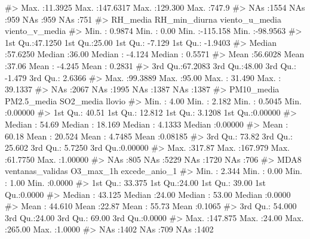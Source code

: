 \documentclass[
  spanish,
  letterpaper,
  DIV=11,
  numbers=noendperiod]{scrartcl}
\newenvironment{Shaded}{\begin{snugshade}}{\end{snugshade}}
\newcommand{\CommentTok}[1]{\textcolor[rgb]{0.37,0.37,0.37}{#1}}
\begin{document}
\begin{Shaded}
\begin{Highlighting}[]
\CommentTok{\#\textgreater{}  Max.   :11.3925   Max.   :147.6317   Max.   :129.300   Max.   :747.9  }
\CommentTok{\#\textgreater{}  NAs    :1554      NAs    :959        NAs    :959       NAs    :751    }
\CommentTok{\#\textgreater{}     RH\_media       RH\_min\_diurna   viento\_u\_media     viento\_v\_media    }
\CommentTok{\#\textgreater{}  Min.   : 0.9874   Min.   : 0.00   Min.   :{-}115.158   Min.   :{-}98.9563  }
\CommentTok{\#\textgreater{}  1st Qu.:47.1250   1st Qu.:25.00   1st Qu.:  {-}7.129   1st Qu.: {-}1.9403  }
\CommentTok{\#\textgreater{}  Median :57.6250   Median :36.00   Median :  {-}4.124   Median :  0.5571  }
\CommentTok{\#\textgreater{}  Mean   :56.6028   Mean   :37.06   Mean   :  {-}4.245   Mean   :  0.2831  }
\CommentTok{\#\textgreater{}  3rd Qu.:67.2083   3rd Qu.:48.00   3rd Qu.:  {-}1.479   3rd Qu.:  2.6366  }
\CommentTok{\#\textgreater{}  Max.   :99.3889   Max.   :95.00   Max.   :  31.490   Max.   : 39.1337  }
\CommentTok{\#\textgreater{}  NAs    :2067      NAs    :1995    NAs    :1387       NAs    :1387      }
\CommentTok{\#\textgreater{}    PM10\_media      PM2.5\_media        SO2\_media           llovio       }
\CommentTok{\#\textgreater{}  Min.   :  4.00   Min.   :  2.182   Min.   : 0.5045   Min.   :0.00000  }
\CommentTok{\#\textgreater{}  1st Qu.: 40.51   1st Qu.: 12.812   1st Qu.: 3.1208   1st Qu.:0.00000  }
\CommentTok{\#\textgreater{}  Median : 54.69   Median : 18.169   Median : 4.1333   Median :0.00000  }
\CommentTok{\#\textgreater{}  Mean   : 60.18   Mean   : 20.524   Mean   : 4.7485   Mean   :0.08185  }
\CommentTok{\#\textgreater{}  3rd Qu.: 73.82   3rd Qu.: 25.602   3rd Qu.: 5.7250   3rd Qu.:0.00000  }
\CommentTok{\#\textgreater{}  Max.   :317.87   Max.   :167.979   Max.   :61.7750   Max.   :1.00000  }
\CommentTok{\#\textgreater{}  NAs    :805      NAs    :5229      NAs    :1720      NAs    :706      }
\CommentTok{\#\textgreater{}       MDA8         ventanas\_validas   O3\_max\_1h      excede\_anio\_1   }
\CommentTok{\#\textgreater{}  Min.   :  2.344   Min.   : 0.00    Min.   :  1.00   Min.   :0.0000  }
\CommentTok{\#\textgreater{}  1st Qu.: 33.375   1st Qu.:24.00    1st Qu.: 39.00   1st Qu.:0.0000  }
\CommentTok{\#\textgreater{}  Median : 43.125   Median :24.00    Median : 53.00   Median :0.0000  }
\CommentTok{\#\textgreater{}  Mean   : 44.610   Mean   :22.87    Mean   : 55.73   Mean   :0.1065  }
\CommentTok{\#\textgreater{}  3rd Qu.: 54.000   3rd Qu.:24.00    3rd Qu.: 69.00   3rd Qu.:0.0000  }
\CommentTok{\#\textgreater{}  Max.   :147.875   Max.   :24.00    Max.   :265.00   Max.   :1.0000  }
\CommentTok{\#\textgreater{}  NAs    :1402                       NAs    :709      NAs    :1402    }

\end{Highlighting}
\end{Shaded}
\end{document}
